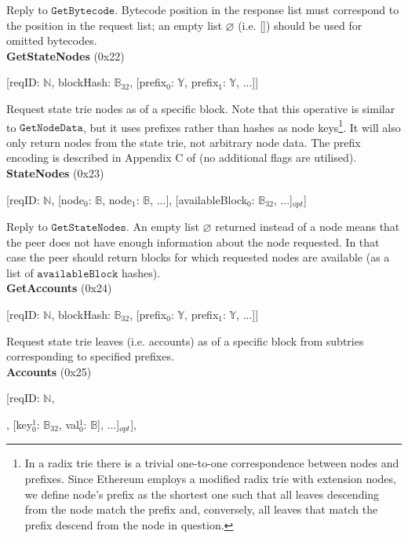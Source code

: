\documentclass{amsart}
\begin{document}
Reply to $\texttt{GetBytecode}$.
Bytecode position in the response list must correspond to the position in the request list;
an empty list $\varnothing$ (i.e. []) should be used for omitted bytecodes.\\

\textbf{GetStateNodes} (0x22)

[reqID: $\mathbb{N}$, blockHash: $\mathbb{B}_{32}$,
[prefix$_0$: $\mathbb{Y}$, prefix$_1$: $\mathbb{Y}$, ...]]
\medskip

Request state trie nodes as of a specific block.
Note that this operative is similar to $\texttt{GetNodeData}$,
but it uses prefixes rather than hashes as node keys\footnote{In
a radix trie there is a trivial one-to-one correspondence between nodes and prefixes.
Since Ethereum employs a modified radix trie with extension nodes,
we define node's prefix as the shortest one such that
all leaves descending from the node match the prefix
and, conversely, all leaves that match the prefix descend from the node in question.}.
It will also only return nodes from the state trie,
not arbitrary node data.
The prefix encoding is described in Appendix C of \cite{yellow_paper}
(no additional flags are utilised).\\

\textbf{StateNodes} (0x23)

[reqID: $\mathbb{N}$,
[node$_0$: $\mathbb{B}$, node$_1$: $\mathbb{B}$, ...],
[availableBlock$_0$: $\mathbb{B}_{32}$, ...]$_{opt}$]
\medskip

Reply to $\texttt{GetStateNodes}$.
An empty list $\varnothing$ returned instead of a node means that the peer does not have enough information about the node requested.
In that case the peer should return blocks for which requested nodes are available
(as a list of $\texttt{availableBlock}$ hashes).\\

\textbf{GetAccounts} (0x24)

[reqID: $\mathbb{N}$, blockHash: $\mathbb{B}_{32}$, [prefix$_0$: $\mathbb{Y}$, prefix$_1$: $\mathbb{Y}$, ...]]
\medskip

Request state trie leaves (i.e. accounts) as of a specific block
from subtries corresponding to specified prefixes.\\

\textbf{Accounts} (0x25)

[reqID: $\mathbb{N}$,

\quad [

\qquad [status$_0$: $\mathbb{N}$, [[key$^0_{0}$: $\mathbb{B}_{32}$, val$^0_{0}$: $\mathbb{B}$], [key$^1_{0}$: $\mathbb{B}_{32}$, val$^1_{0}$: $\mathbb{B}$], ...]$_{opt}$],
\end{document}
